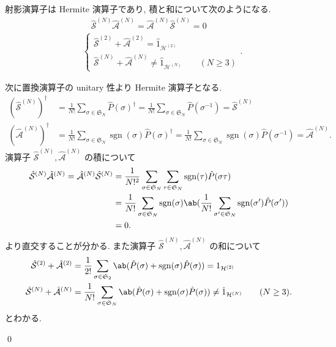 \documentclass[uplatex,dvipdfmx,a4paper,11pt]{jlreq}
\makeatletter
\DeclareMathOperator{\sgn}{sgn}
\newcommand{\HH}{\mathcal{H}}
\renewcommand{\SS}{\mathfrak{S}}
\renewcommand{\S}{\mathcal{S}}
\newcommand{\A}{\mathcal{A}}
\numberwithin{equation}{section}
\theoremstyle{definition}
\renewenvironment{proof}[1][\proofname]{\par
  \normalfont
  \topsep6\p@\@plus6\p@ \trivlist
  \item[\hskip\labelsep{\bfseries #1}\@addpunct{\bfseries}]\ignorespaces\quad\par
}{
  \qed\endtrivlist\@endpefalse
}
\renewcommand\proofname{証明}
\makeatother
\begin{document}
\begin{proposition}[Q21-14(iii)(iv)(v)]
  射影演算子は Hermite 演算子であり, 積と和について次のようになる.
  \begin{align}
     & \quad \hat{\S}^{(N)}\hat{\A}^{(N)} = \hat{\A}^{(N)}\hat{\S}^{(N)} = 0     \\
     & \begin{cases}
         \hat{\S}^{(2)} + \hat{\A}^{(2)} = \hat{1}_{\HH^{(2)}} \\
         \hat{\S}^{(N)} + \hat{\A}^{(N)} \neq \hat{1}_{\HH^{(N)}} \qquad (N \geq 3)
       \end{cases}.
  \end{align}
\end{proposition}
\begin{proof}
  次に置換演算子の unitary 性より Hermite 演算子となる.
  \begin{align}
    (\hat{\S}^{(N)})^\dagger & = \frac{1}{N!}\sum_{\sigma\in\SS_N}\hat{P}(\sigma)^\dagger = \frac{1}{N!}\sum_{\sigma\in\SS_N}\hat{P}(\sigma^{-1}) = \hat{\S}^{(N)}                          \\
    (\hat{\A}^{(N)})^\dagger & = \frac{1}{N!}\sum_{\sigma\in\SS_N}\sgn(\sigma)\hat{P}(\sigma)^\dagger = \frac{1}{N!}\sum_{\sigma\in\SS_N}\sgn(\sigma)\hat{P}(\sigma^{-1}) = \hat{\A}^{(N)}.
  \end{align}
  演算子 $\hat{\S}^{(N)}, \hat{\A}^{(N)}$ の積について
  \begin{align}
    \hat{\S}^{(N)}\hat{\A}^{(N)} = \hat{\A}^{(N)}\hat{\S}^{(N)} & = \frac{1}{N!^2}\sum_{\sigma\in\SS_N}\sum_{\tau\in\SS_N}\sgn(\tau)\hat{P}(\sigma\tau)                               \\
                                                                & = \frac{1}{N!}\sum_{\sigma\in\SS_N}\sgn(\sigma)\ab(\frac{1}{N!}\sum_{\sigma'\in\SS_N}\sgn(\sigma')\hat{P}(\sigma')) \\
                                                                & = 0.
  \end{align}
  より直交することが分かる. また演算子 $\hat{\S}^{(N)}, \hat{\A}^{(N)}$ の和について
  \begin{align}
    \hat{\S}^{(2)} + \hat{\A}^{(2)} & = \frac{1}{2!}\sum_{\sigma\in\SS_2}\ab(\hat{P}(\sigma) + \sgn(\sigma)\hat{P}(\sigma)) = 1_{\HH^{(2)}}                             \\
    \hat{\S}^{(N)} + \hat{\A}^{(N)} & = \frac{1}{N!}\sum_{\sigma\in\SS_N}\ab(\hat{P}(\sigma) + \sgn(\sigma)\hat{P}(\sigma)) \neq \hat{1}_{\HH^{(N)}} \qquad (N \geq 3).
  \end{align}
  とわかる.
\end{proof}
\end{document}
